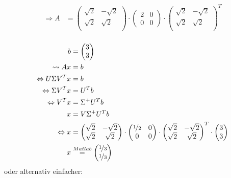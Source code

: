 \begin{equation}
\begin{split}
	\Rightarrow
	A 
	&= 
	\begin{pmatrix}
		\sqrt{2}&-\sqrt{2}\\
		\sqrt{2}&\sqrt{2}\\
	\end{pmatrix}
	\cdot
	\begin{pmatrix}
		2&0\\
		0&0
	\end{pmatrix}
	\cdot 
	\begin{pmatrix}
		\sqrt{2}&-\sqrt{2}\\
		\sqrt{2}&\sqrt{2}\\
	\end{pmatrix}^T\\
\end{split}\end{equation}

\begin{equation}\begin{split}
	b &= \begin{pmatrix}3\\3\end{pmatrix}\\
	\leadsto 
	Ax &= b\\
	\Leftrightarrow
	U \Sigma V^T  x &= b\\
	\Leftrightarrow
	\Sigma V^T x &= U^T b\\
	\Leftrightarrow
	V^T x &= \Sigma^+ U^T b\\
	x &= V \Sigma^+ U^T b\\
	\Leftrightarrow
	x &=
	\begin{pmatrix}
		\sqrt{2}&-\sqrt{2}\\
		\sqrt{2}&\sqrt{2}\\
	\end{pmatrix}
	\cdot 
	\begin{pmatrix}
		\nicefrac{1}{2}&0\\
		0&0
	\end{pmatrix}
	\cdot	
	\begin{pmatrix}
		\sqrt{2}&-\sqrt{2}\\
		\sqrt{2}&\sqrt{2}\\
	\end{pmatrix}^T
	\cdot 
	\begin{pmatrix}3\\3\end{pmatrix}\\
	x &\stackrel{Matlab}{=}
	\begin{pmatrix}
		\nicefrac{1}{3}\\\nicefrac{1}{3}
	\end{pmatrix}
\end{split}\end{equation}
oder alternativ einfacher:

